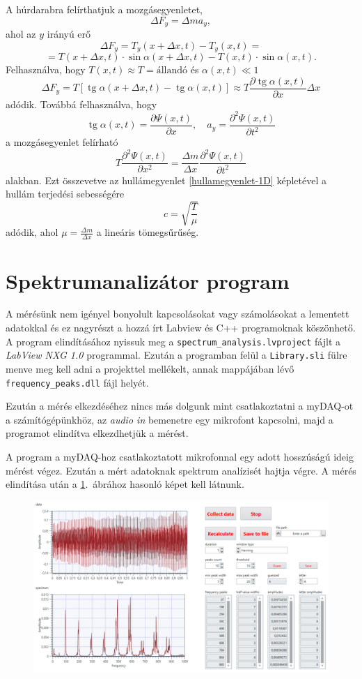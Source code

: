 \documentclass[a4paper,12pt]{article}
\DeclareMathOperator{\tg}{tg}
\begin{document}
A húrdarabra felírthatjuk a mozgásegyenletet,
$$ \Delta F_y = \Delta m a_y, $$
ahol az $y$ irányú erő
$$ \Delta F_y = T_y(x + \Delta x, t) - T_y(x, t) = $$
$$ = T(x + \Delta x, t) \cdot \sin\alpha(x + \Delta x, t) - T(x, t) \cdot \sin\alpha(x, t). $$
Felhasználva, hogy $T(x, t) \approx T = \text{állandó}$ és $\alpha(x, t) \ll 1$
$$ \Delta F_y = T \left[ \tg\alpha(x + \Delta x, t) - \tg\alpha(x, t) \right] \approx T \frac{\partial \tg\alpha(x, t)}{\partial x} \Delta x $$
adódik. Továbbá felhasználva, hogy
$$ \tg\alpha(x, t) = \frac{\partial \Psi(x, t)}{\partial x}, \quad a_y = \frac{\partial^2 \Psi(x, t)}{\partial t^2} $$
a mozgásegyenlet felírható
$$ T \frac{\partial^2 \Psi(x, t)}{\partial x^2} = \frac{\Delta m}{\Delta x} \frac{\partial^2 \Psi(x, t)}{\partial t^2} $$
alakban. Ezt összevetve az hullámegyenlet \eqref{hullamegyenlet-1D} képletével a hullám terjedési sebességére
$$ c = \sqrt{\frac{T}{\mu}} $$
adódik, ahol $\mu = \frac{\Delta m}{\Delta x}$ a lineáris tömegsűrűség.



\section{Spektrumanalizátor program}

A mérésünk nem igényel bonyolult kapcsolásokat vagy számolásokat a lementett adatokkal és ez nagyrészt a hozzá írt Labview és C++ programoknak köszönhető. A program elindításához nyissuk meg a \texttt{spectrum\_analysis.lvproject} fájlt a \emph{LabView NXG 1.0} programmal. Ezután a programban felül a \texttt{Library.sli} fülre menve meg kell adni a projekttel mellékelt, annak mappájában lévő \texttt{frequency\_peaks.dll} fájl helyét.

Ezután a mérés elkezdéséhez nincs más dolgunk mint csatlakoztatni a myDAQ-ot a számítógépünkhöz, az \textit{audio in} bemenetre egy mikrofont kapcsolni, majd a programot elindítva elkezdhetjük a mérést.

A program a myDAQ-hoz csatlakoztatott mikrofonnal egy adott hosszúságú ideig mérést végez. Ezután a mért adatoknak spektrum analízisét hajtja végre. A mérés elindítása után a \ref{labview}.\ ábrához hasonló képet kell látnunk.

\begin{figure}[h]
\includegraphics[width=\textwidth]{labview.png}
\caption{}
\label{labview}
\end{figure}
\end{document}
